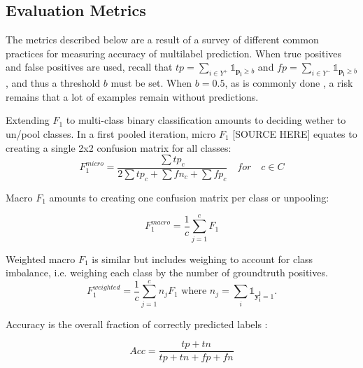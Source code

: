 


\subsection{Evaluation Metrics}
\label{sec:org23c8447}


The metrics described below are a result of a survey of different common practices for measuring accuracy of multilabel prediction. When true positives and false positives are used, recall that \(t p=\sum_{i \in Y^{+}} \mathds{1}_{\mathbf{p_i} \geq b}\) and \(f p=\sum_{i \in Y^{-}} \mathds{1}_{\mathbf{p_i} \geq b}\), and thus a threshold \(b\) must be set. When \(b = 0.5\), as is commonly done , a risk remains that a lot of examples remain without predictions.

Extending \(F_1\) to multi-class binary classification amounts to deciding wether to un/pool classes.
In a first pooled iteration, micro \(F_1\) [SOURCE HERE] equates to creating a single 2x2 confusion matrix for all classes:
$$F_1^{micro} = \frac{\sum tp_c}{2 \sum tp_c + \sum fn_c + \sum fp_c} \quad for \quad c \in C$$

Macro \(F_1\) \cite{threshForF1} amounts to creating one confusion matrix per class or unpooling:

$$F_1^{macro} = \frac{1}{c} \sum_{j=1}^c F_1$$


Weighted macro \(F_1\)  is similar but includes weighing to account for class imbalance, i.e. weighing each class by the number of groundtruth positives.
\begin{equation}
F_1^{weighted} = \frac{1}{c} \sum_{j=1}^c n_j F_1 \text{ where } n_j = \sum_i \mathds{1}_{\mathbf{y_i^j} = 1}.
\end{equation}


Accuracy is the overall fraction of correctly predicted labels \cite{threshForF1}:

$$
A c c=\frac{t p+t n}{t p+t n+f p+f n}
$$

